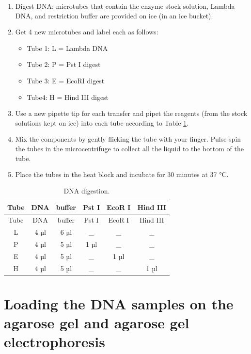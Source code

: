 \documentclass[]{book}
\providecommand{\tightlist}{%
  \setlength{\itemsep}{0pt}\setlength{\parskip}{0pt}}
\theoremstyle{definition}
\theoremstyle{definition}
\theoremstyle{definition}
\theoremstyle{remark}
\begin{document}
\begin{enumerate}
\def\labelenumi{\arabic{enumi}.}
\tightlist
\item
  Digest DNA: microtubes that contain the enzyme stock solution, Lambda
  DNA, and restriction buffer are provided on ice (in an ice bucket).
\item
  Get 4 new microtubes and label each as follows:

  \begin{itemize}
  \tightlist
  \item
    Tube 1: L = Lambda DNA
  \item
    Tube 2: P = Pst I digest
  \item
    Tube 3: E = EcoRI digest
  \item
    Tube4: H = Hind III digest
  \end{itemize}
\item
  Use a new pipette tip for each transfer and pipet the reagents (from
  the stock solutions kept on ice) into each tube according to Table
  \ref{tab:digest}.
\item
  Mix the components by gently flicking the tube with your finger. Pulse
  spin the tubes in the microcentrifuge to collect all the liquid to the
  bottom of the tube.
\item
  Place the tubes in the heat block and incubate for 30 minutes at 37
  °C.
\end{enumerate}

\begin{longtable}[]{@{}cccccc@{}}
\caption{\label{tab:digest} DNA digestion.}\tabularnewline
\toprule
Tube & DNA & buffer & Pst I & EcoR I & Hind III\tabularnewline
\midrule
\endfirsthead
\toprule
Tube & DNA & buffer & Pst I & EcoR I & Hind III\tabularnewline
\midrule
\endhead
L & 4 µl & 6 µl & \_ & \_ & \_\tabularnewline
P & 4 µl & 5 µl & 1 µl & \_ & \_\tabularnewline
E & 4 µl & 5 µl & \_ & 1 µl & \_\tabularnewline
H & 4 µl & 5 µl & \_ & \_ & 1 µl\tabularnewline
\bottomrule
\end{longtable}

\section{Loading the DNA samples on the agarose gel and agarose gel
electrophoresis}\label{loading-the-dna-samples-on-the-agarose-gel-and-agarose-gel-electrophoresis}
\end{document}
